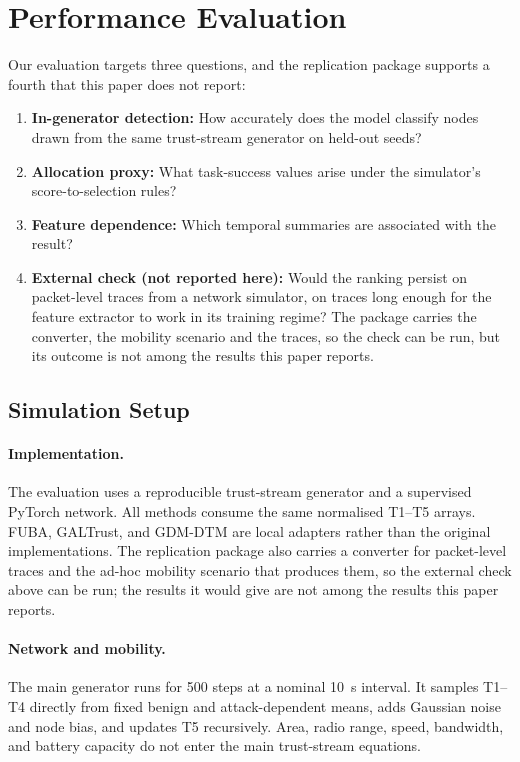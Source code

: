 \documentclass[notspecified,article,submit,moreauthors]{Definitions/mdpi}
\begin{document}
\section{Performance Evaluation}
\label{sec:evaluation}

Our evaluation targets three questions, and the replication package supports a fourth that this paper does not report:
\begin{enumerate}[label={(\textbf{Q\arabic*})},leftmargin=*]
    \item \textbf{In-generator detection:} How accurately does the model classify nodes drawn from the same trust-stream generator on held-out seeds?
    \item \textbf{Allocation proxy:} What task-success values arise under the simulator's score-to-selection rules?
    \item \textbf{Feature dependence:} Which temporal summaries are associated with the result?
    \item \textbf{External check (not reported here):} Would the ranking persist on packet-level traces from a network simulator, on traces long enough for the feature extractor to work in its training regime? The package carries the converter, the mobility scenario and the traces, so the check can be run, but its outcome is not among the results this paper reports.
\end{enumerate}

\subsection{Simulation Setup}
\label{sec:sim_setup}

\paragraph{Implementation.}
The evaluation uses a reproducible trust-stream generator and a supervised PyTorch network. All methods consume the same normalised T1--T5 arrays. FUBA, GALTrust, and GDM-DTM are local adapters rather than the original implementations. The replication package also carries a converter for packet-level traces and the ad-hoc mobility scenario that produces them, so the external check above can be run; the results it would give are not among the results this paper reports.

\paragraph{Network and mobility.}
The main generator runs for 500 steps at a nominal 10~s interval. It samples T1--T4 directly from fixed benign and attack-dependent means, adds Gaussian noise and node bias, and updates T5 recursively. Area, radio range, speed, bandwidth, and battery capacity do not enter the main trust-stream equations.
\end{document}
